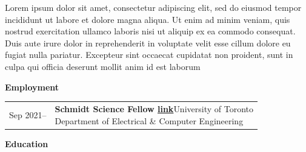 \documentclass{scrartcl}
\begin{document}
Lorem ipsum dolor sit amet, consectetur adipiscing elit, sed do eiusmod tempor incididunt ut labore et dolore magna aliqua. Ut enim ad minim veniam, quis nostrud exercitation ullamco laboris nisi ut aliquip ex ea commodo consequat. Duis aute irure dolor in reprehenderit in voluptate velit esse cillum dolore eu fugiat nulla pariatur. Excepteur sint occaecat cupidatat non proident, sunt in culpa qui officia deserunt mollit anim id est laborum \vspace{1cm}

\newcommand{\secttitle}[1]{{{\Large\textbf{#1}}}\par\medskip}
\newcommand{\sectsubtitle}[1]{{{\large\textbf{#1}}}\par\medskip}

\setlength{\tabcolsep}{0pt}
\newenvironment{entrylist}{%
  \begin{longtable}{@{\extracolsep{\fill}}ll}
}{%
  \end{longtable}
}
\newcommand{\entry}[4]{%
  {\addfontfeature{Color=gray} #1}&\parbox[t]{0.8\textwidth}{%
    \textbf{#2}\hfill #3\\ #4\vspace{\parsep}%
  }\\}
\newcommand{\refentry}[3]{%
  {\addfontfeature{Color=gray} #1}&\parbox[t]{0.8\textwidth}{%
    \raggedright#2\\ {{\raggedright\small #3}}\vspace{\parsep}%
  }\\}
\newcommand{\singleentry}[2]{%
  {\addfontfeature{Color=gray} #1}&\parbox[t]{0.8\textwidth}{%
    #2\vspace{\parsep}%
  }\\}
\newcommand{\splitentry}[4]{%
  {\addfontfeature{Color=gray} #1}&\parbox[t]{0.8\textwidth}{%
    \raggedright #2\hfill #3\\ \raggedright\small #4\vspace{\parsep}%
  }\\}


\raggedright

\secttitle{Employment}
\begin{entrylist}
\entry
{Sep 2021–}
{Schmidt Science Fellow \textnormal{\href{https://schmidtsciencefellows.org/fellow/suhas-mahesh/}{link}}}
{University of Toronto}
{Department of Electrical \& Computer Engineering}
\end{entrylist}

\secttitle{Education}
\end{document}
